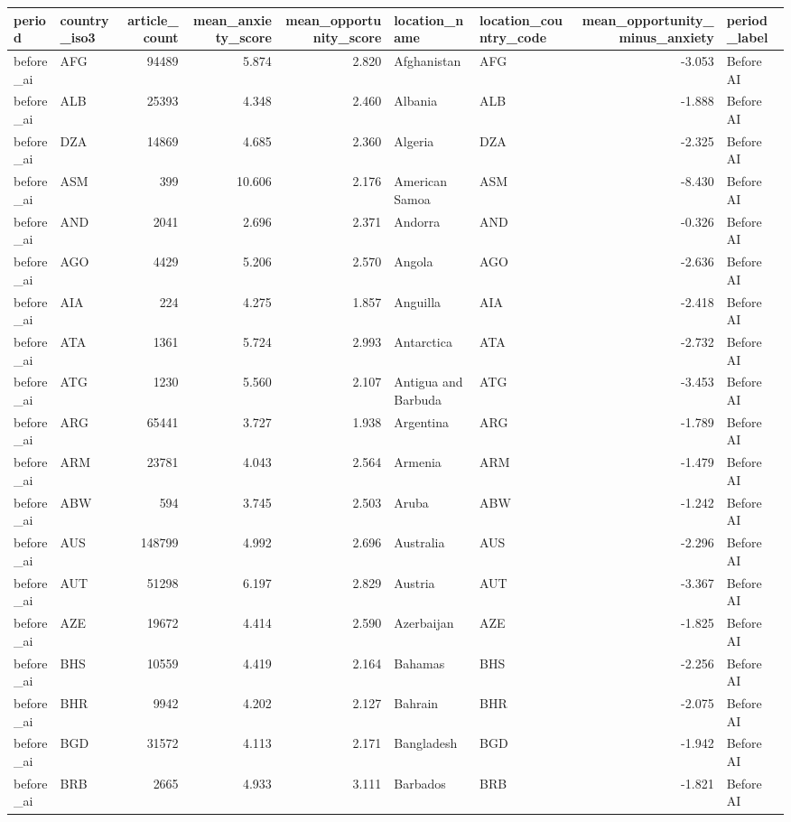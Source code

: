 \begin{tabular}{llrrrllrl}
\toprule
period & country\_iso3 & article\_count & mean\_anxiety\_score & mean\_opportunity\_score & location\_name & location\_country\_code & mean\_opportunity\_minus\_anxiety & period\_label \\
\midrule
before\_ai & AFG & 94489 & 5.874 & 2.820 & Afghanistan & AFG & -3.053 & Before AI \\
before\_ai & ALB & 25393 & 4.348 & 2.460 & Albania & ALB & -1.888 & Before AI \\
before\_ai & DZA & 14869 & 4.685 & 2.360 & Algeria & DZA & -2.325 & Before AI \\
before\_ai & ASM & 399 & 10.606 & 2.176 & American Samoa & ASM & -8.430 & Before AI \\
before\_ai & AND & 2041 & 2.696 & 2.371 & Andorra & AND & -0.326 & Before AI \\
before\_ai & AGO & 4429 & 5.206 & 2.570 & Angola & AGO & -2.636 & Before AI \\
before\_ai & AIA & 224 & 4.275 & 1.857 & Anguilla & AIA & -2.418 & Before AI \\
before\_ai & ATA & 1361 & 5.724 & 2.993 & Antarctica & ATA & -2.732 & Before AI \\
before\_ai & ATG & 1230 & 5.560 & 2.107 & Antigua and Barbuda & ATG & -3.453 & Before AI \\
before\_ai & ARG & 65441 & 3.727 & 1.938 & Argentina & ARG & -1.789 & Before AI \\
before\_ai & ARM & 23781 & 4.043 & 2.564 & Armenia & ARM & -1.479 & Before AI \\
before\_ai & ABW & 594 & 3.745 & 2.503 & Aruba & ABW & -1.242 & Before AI \\
before\_ai & AUS & 148799 & 4.992 & 2.696 & Australia & AUS & -2.296 & Before AI \\
before\_ai & AUT & 51298 & 6.197 & 2.829 & Austria & AUT & -3.367 & Before AI \\
before\_ai & AZE & 19672 & 4.414 & 2.590 & Azerbaijan & AZE & -1.825 & Before AI \\
before\_ai & BHS & 10559 & 4.419 & 2.164 & Bahamas & BHS & -2.256 & Before AI \\
before\_ai & BHR & 9942 & 4.202 & 2.127 & Bahrain & BHR & -2.075 & Before AI \\
before\_ai & BGD & 31572 & 4.113 & 2.171 & Bangladesh & BGD & -1.942 & Before AI \\
before\_ai & BRB & 2665 & 4.933 & 3.111 & Barbados & BRB & -1.821 & Before AI \\

\end{tabular}
